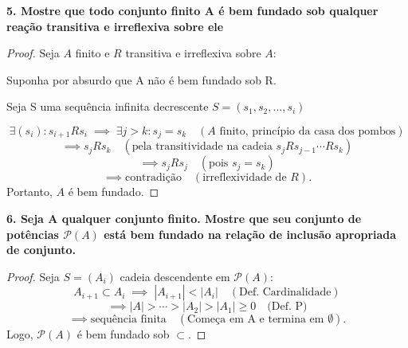 \textbf{5. Mostre que todo conjunto finito A é bem fundado sob qualquer reação transitiva e irreflexiva sobre ele}

\begin{proof}
	Seja $A$ finito e $R$ transitiva e irreflexiva sobre $A$:

	Suponha por absurdo que A não é bem fundado sob R.

	Seja S uma sequência infinita decrescente $S = (s_1,s_2,...,s_i)$

	\[
		\exists (s_i): s_{i+1}Rs_i
		\;\implies\; \exists j>k: s_j=s_k \quad (\text{$A$ finito, princípio da casa dos pombos})
	\]
	\[
		\implies s_jRs_k \quad (\text{pela transitividade na cadeia $s_jRs_{j-1}\cdots Rs_k$})
	\]
	\[
		\implies s_jRs_j \quad (\text{pois $s_j=s_k$})
	\]
	\[
		\implies \text{contradição} \quad (\text{irreflexividade de $R$}).
	\]
	Portanto, $A$ é bem fundado.
\end{proof}

\bigskip

\textbf{6. Seja A qualquer conjunto finito. Mostre que seu conjunto de potências $\mathscr{P}(A)$ está bem fundado na relação de inclusão apropriada de conjunto.}

\begin{proof}
	Seja $S=(A_i)$ cadeia descendente em $\mathscr{P}(A)$:
	\[
		A_{i+1}\subset A_i
		\;\implies\; |A_{i+1}|<|A_i| \quad (\text{Def. Cardinalidade})
	\]
	\[
		\implies |A| > \cdots > |A_2| > |A_1| \ge 0 \quad (\text{Def. P)}
	\]
	\[
		\implies \text{sequência finita} \quad (\text{Começa em A e termina em } \emptyset).
	\]
	Logo, $\mathscr{P}(A)$ é bem fundado sob $\subset$.
\end{proof}